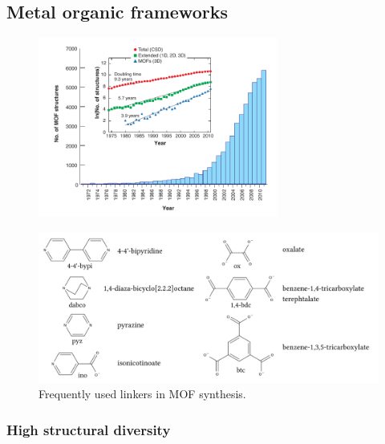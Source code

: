 \documentclass[thesis]{subfiles}
\begin{document}
\subsection{Metal organic frameworks}

\begin{figure}[ht]
    \centering
    \includegraphics[width=0.7\textwidth]{figures/images/number-of-mofs}
    \caption{\TODO}
    \label{fig:number-of-mofs}
\end{figure}

\begin{figure}[ht]
    \centering
    \includegraphics[width=\textwidth]{figures/images/mof-linkers}
    \caption{Frequently used linkers in MOF synthesis.}
    \label{fig:mof-linkers}
\end{figure}

\subsubsection{High structural diversity}
\end{document}
